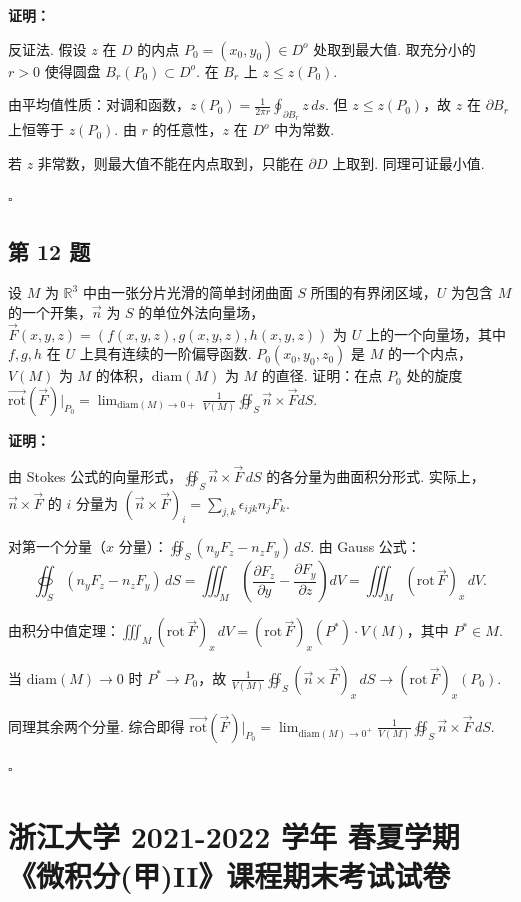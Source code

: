 \documentclass[12pt,a4paper]{article}
\newenvironment{sol}[1][解]{%
  \par\medskip\noindent\textbf{#1：}\itshape\par\noindent\ignorespaces
}{%
  \par\hfill$\square$\par\medskip
}
\begin{document}
\begin{sol}[证明]反证法. 假设 $z$ 在 $D$ 的内点 $P_0=(x_0,y_0)\in D^o$ 处取到最大值.
  取充分小的 $r>0$ 使得圆盘 $B_r(P_0)\subset D^o$. 在 $B_r$ 上 $z\le z(P_0)$.

  由平均值性质：对调和函数，$z(P_0)=\frac{1}{2\pi r}\oint_{\partial B_r}z\,ds$. 但
  $z\le z(P_0)$，故 $z$ 在 $\partial B_r$ 上恒等于 $z(P_0)$. 由 $r$ 的任意性，$z$
  在 $D^o$ 中为常数.

  若 $z$ 非常数，则最大值不能在内点取到，只能在 $\partial D$ 上取到. 同理可证最小值.
\end{sol}
\subsection*{第 12 题}
设 $M$ 为 $\mathbb{R}^3$ 中由一张分片光滑的简单封闭曲面 $S$ 所围的有界闭区域，$U$ 为包含 $M$
的一个开集，$\vec{n}$ 为 $S$ 的单位外法向量场，$\vec{F}(x,y,z)=(f(x,y,z), g(x,y,z),
h(x,y,z))$ 为 $U$ 上的一个向量场，其中 $f, g, h$ 在 $U$ 上具有连续的一阶偏导函数.
$P_0(x_0,y_0,z_0)$ 是 $M$ 的一个内点，$V(M)$ 为 $M$ 的体积，$\text{diam}(M)$ 为
$M$ 的直径. 证明：在点 $P_0$ 处的旋度
$\vec{\text{rot}}(\vec{F})|_{P_0}=\lim_{\text{diam}(M)\rightarrow0+}\frac{1}{V(M)}\oiint_{S}\vec{n}\times\vec{F}dS$.

\begin{sol}[证明]由 Stokes 公式的向量形式，$\oiint_S\vec{n}\times\vec{F}\,dS$
  的各分量为曲面积分形式. 实际上，$\vec{n}\times\vec{F}$ 的 $i$ 分量为
  $(\vec{n}\times\vec{F})_i=\sum_{j,k}\epsilon_{ijk}n_jF_k$.

  对第一个分量（$x$ 分量）：$\oiint_S(n_yF_z-n_zF_y)\,dS$. 由 Gauss 公式：
  $$\oiint_S(n_yF_z-n_zF_y)\,dS=\iiint_M\left(\frac{\partial
    F_z}{\partial y}-\frac{\partial F_y}{\partial
  z}\right)dV=\iiint_M(\text{rot}\,\vec{F})_x\,dV.$$

  由积分中值定理：$\iiint_M(\text{rot}\,\vec{F})_x\,dV=(\text{rot}\,\vec{F})_x(P^*)\cdot
  V(M)$，其中 $P^*\in M$.

  当 $\text{diam}(M)\to 0$ 时 $P^*\to P_0$，故
  $\frac{1}{V(M)}\oiint_S(\vec{n}\times\vec{F})_x\,dS\to(\text{rot}\,\vec{F})_x(P_0)$.

  同理其余两个分量. 综合即得
  $\vec{\text{rot}}(\vec{F})|_{P_0}=\lim_{\text{diam}(M)\to
  0^+}\frac{1}{V(M)}\oiint_S\vec{n}\times\vec{F}\,dS.$
\end{sol}
\section*{浙江大学 2021-2022 学年 春夏学期 《微积分(甲)II》课程期末考试试卷}
\end{document}
